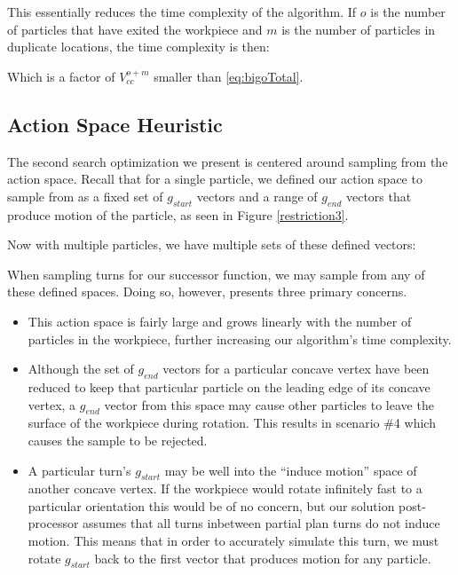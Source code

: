 This essentially reduces the time complexity of the algorithm. If $o$ is the number of particles that have exited the workpiece and $m$ is the number of particles in duplicate locations, the time complexity is then:

 {
  \label{eq:bigoTotalWithHeuristic}
}

Which is a factor of $V_{cc}^{o + m}$ smaller than \eqref{eq:bigoTotal}.

\subsection{Action Space Heuristic}

The second search optimization we present is centered around sampling from the action space. Recall that for a single particle, we defined our action space to sample from as a fixed set of $g_{start}$ vectors and a range of $g_{end}$ vectors that produce motion of the particle, as seen in Figure \ref{restriction3}.

Now with multiple particles, we have multiple sets of these defined vectors:


When sampling turns for our successor function, we may sample from any of these defined spaces. Doing so, however, presents three primary concerns.

\begin{itemize}
\item This action space is fairly large and grows linearly with the number of particles in the workpiece, further increasing our algorithm's time complexity.
\item Although the set of $g_{end}$ vectors for a particular concave vertex have been reduced to keep that particular particle on the leading edge of its concave vertex, a $g_{end}$ vector from this space may cause other particles to leave the surface of the workpiece during rotation. This results in scenario \#4 which causes the sample to be rejected.
\item A particular turn's $g_{start}$ may be well into the ``induce motion'' space of another concave vertex. If the workpiece would rotate infinitely fast to a particular orientation this would be of no concern, but our solution post-processor assumes that all turns inbetween partial plan turns do not induce motion. This means that in order to accurately simulate this turn, we must rotate $g_{start}$ back to the first vector that produces motion for any particle.
\end{itemize}

